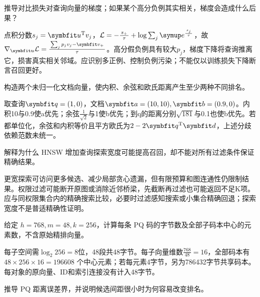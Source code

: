 \begin{exercises}
\begin{exercise} 推导对比损失对查询向量的梯度；如果某个高分负例其实相关，梯度会造成什么后果？

\begin{solution}
点积分数$s_j=\vect{u}^{\mathrm{T}}v_j$，$\mathcal L=-\frac{s_+}{\tau}+\log\sum_j \conste{}^{\frac{s_j}{\tau}}$，故 $\nabla_{\vect{u}}\mathcal L=\frac{\sum_jp_jv_j-\vect{v}_+}{\tau}$。高分假负例具有较大$p_j$，梯度下降将查询推离它，损害真实相关邻域。应识别多正例、控制负例污染；不能仅以训练损失下降断言召回更好。
\end{solution}
\end{exercise}

\begin{exercise} 构造两个未归一化文档向量，使内积、余弦和欧氏距离产生至少两种不同排名。

\begin{solution}
取查询$\vect{q}=(1,0)$，文档$\vect{a}=(10,10),\vect{b}=(0.9,0)$。内积10与0.9使a优先；余弦$\frac{1}{\sqrt2}$与1使b优先；到q的距离分别$\sqrt{181}$与0.1也使b优先。若都单位化，余弦和内积等价且平方欧氏为$2-2\vect{q}^{\mathrm{T}}\vect{d}$，上述分歧依赖范数未统一。
\end{solution}
\end{exercise}

\begin{exercise}\optional 解释为什么 HNSW 增加查询探索宽度可能提高召回，却不能对所有过滤条件保证精确结果。

\begin{solution}
更宽探索可访问更多候选、减少局部贪心遗漏，但有限预算和图连通性仍限制结果。权限过滤可能断开原图或消除近邻桥梁，先截断再过滤也可能返回不足K项。应与同权限集合内的精确搜索比较，必要时过滤感知搜索或小集合精确回退；探索宽度不是普适精确性证明。
\end{solution}
\end{exercise}

\begin{exercise}\optional 给定 $h=768,m=48,k=256$，计算每条 PQ 码的字节数及全部子码本中心的元素数，不含原始精排向量。

\begin{solution}
每子空间需$\log_2 256=8$位，48段共48字节。每子向量维数$\frac{768}{48}=16$，全部码本有 $48\times256\times16=196608$ 个中心元素；若每元素4字节，另为786432字节共享码本。每对象的原向量、ID和索引连接没有计入48字节。
\end{solution}
\end{exercise}

\begin{exercise}\optional 推导 PQ 距离误差界，并说明候选间距很小时为何容易改变排名。


\end{exercise}
\end{exercises}
